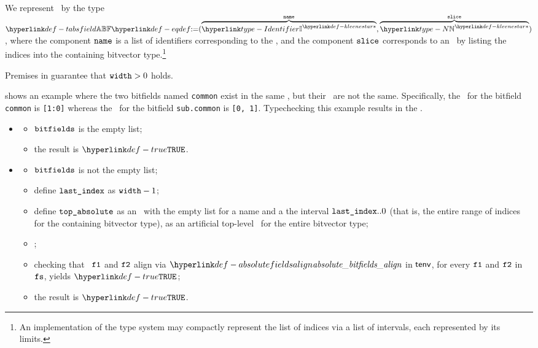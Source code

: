 \hypertarget{def-tabsfield}{}
We represent \absolutebitfields\ by the type
$\TAbsField \eqdef (\overname{\KleeneStar{\Identifier}}{\name}, \overname{\KleeneStar{\N}}{\vslice})$,
where the component $\texttt{name}$ is a list of identifiers corresponding to the \absolutename,
and the component $\texttt{slice}$ corresponds to an \absoluteslice\ by listing the indices
into the containing bitvector type.\footnote{An implementation of the type system may compactly represent the list of indices
via a list of intervals, each represented by its limits.}

Premises in  guarantee that $\texttt{width} > 0$ holds.

 shows an example where the two bitfields named \texttt{common}
exist in the same \bitfieldscope, but their \absoluteslices\ are not the same.
Specifically, the \absoluteslice\ for the bitfield \texttt{common} is \texttt{[1:0]}
whereas the \absoluteslice\ for the bitfield \texttt{sub.common} is \texttt{[0, 1]}.
Typechecking this example results in the \typingerrorterm{} \BadSlices.


\ProseParagraph
\OneApplies
\begin{itemize}
  \item {}
  \begin{itemize}
    \item $\vbitfields$ is the empty list;
    \item the result is $\True$.
  \end{itemize}

  \item {}
  \begin{itemize}
    \item $\vbitfields$ is not the empty list;
    \item define $\texttt{last\_index}$ as $\texttt{width} - 1$;
    \item define $\vtopabsolute$ as an \absolutebitfield\ with the empty list
          for a name and a the interval $\texttt{last\_index}..0$ (that is, the entire range
          of indices for the containing bitvector type),
          as an artificial top-level \absolutebitfield\ for the entire bitvector type;
    \item \Prosebitfieldstoabsolute{$\tenv$}{$\vbitfields$}{$\vtopabsolute$}{$\vfs$};
    \item checking that \absolutebitfields\ $\texttt{f1}$ and $\texttt{f2}$ align via
          $\absolutebitfieldsalign$ in $\tenv$, for every $\texttt{f1}$ and $\texttt{f2}$ in $\vfs$,
          yields $\True$\ProseTerminateAs{\BadSlices};
    \item the result is $\True$.
  \end{itemize}
\end{itemize}

